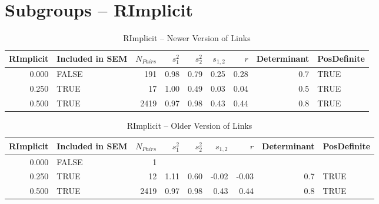 \documentclass{article}\usepackage{graphicx, color}
\begin{document}
\section{Subgroups --  RImplicit }%
\begin{table}[ht]
\centering
\begin{tabular}{rlrrrrrrl}
  \hline
RImplicit & Included in SEM & $N_{Pairs}$ & $s_1^2$ & $s_2^2$ & $s_{1,2}$ & $r$ & Determinant & PosDefinite \\ 
  \hline
0.000 & FALSE & 191 & 0.98 & 0.79 & 0.25 & 0.28 & 0.7 & TRUE \\ 
  0.250 & TRUE & 17 & 1.00 & 0.49 & 0.03 & 0.04 & 0.5 & TRUE \\ 
  0.500 & TRUE & 2419 & 0.97 & 0.98 & 0.43 & 0.44 & 0.8 & TRUE \\ 
   \hline
\end{tabular}
\caption{RImplicit -- Newer Version of Links} 
\end{table}
\begin{table}[ht]
\centering
\begin{tabular}{rlrrrrrrl}
  \hline
RImplicit & Included in SEM & $N_{Pairs}$ & $s_1^2$ & $s_2^2$ & $s_{1,2}$ & $r$ & Determinant & PosDefinite \\ 
  \hline
0.000 & FALSE & 1 &  &  &  &  &  &  \\ 
  0.250 & TRUE & 12 & 1.11 & 0.60 & -0.02 & -0.03 & 0.7 & TRUE \\ 
  0.500 & TRUE & 2419 & 0.97 & 0.98 & 0.43 & 0.44 & 0.8 & TRUE \\ 
   \hline
\end{tabular}
\caption{RImplicit -- Older Version of Links} 
\end{table}
\end{document}
